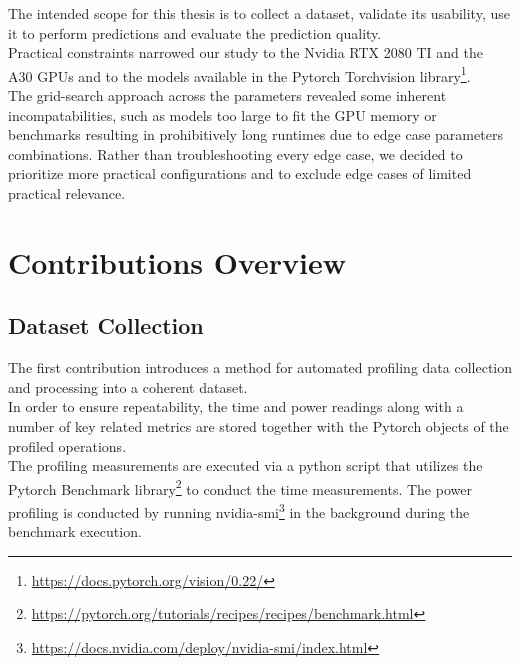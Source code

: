 The intended scope for this thesis is to collect a dataset, validate its usability, use it to perform predictions and evaluate the prediction quality. \\
Practical constraints narrowed our study to the Nvidia RTX 2080 TI and the A30 GPUs and to the models available in the Pytorch Torchvision library\footnote{\url{https://docs.pytorch.org/vision/0.22/}}. \\
The grid-search approach across the parameters revealed some inherent incompatabilities, such as models too large to fit the GPU memory or benchmarks resulting in prohibitively long runtimes due to edge case parameters combinations. Rather than troubleshooting every edge case, we decided to prioritize more practical configurations and to exclude edge cases of limited practical relevance.




\section{Contributions Overview}
\subsection{Dataset Collection}

The first contribution introduces a method for automated profiling data collection and processing into a coherent dataset.\\
In order to ensure repeatability, the time and power readings along with a number of key related metrics are stored together with the Pytorch objects of the profiled operations. \\
The profiling measurements are executed via a python script that utilizes the Pytorch Benchmark library\footnote{\url{https://pytorch.org/tutorials/recipes/recipes/benchmark.html}} to conduct the time measurements. The power profiling is conducted by running nvidia-smi\footnote{\url{https://docs.nvidia.com/deploy/nvidia-smi/index.html}} in the background during the benchmark execution. 


